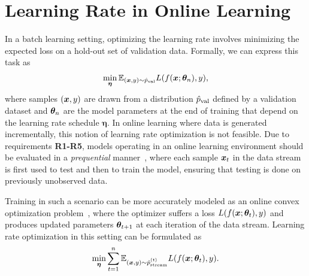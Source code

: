 \documentclass{article} %
\begin{document}
\section{Learning Rate in Online Learning}

In a batch learning setting, optimizing the learning rate involves minimizing the expected loss on a hold-out set of validation data.
Formally, we can express this task as
\begin{equation}
   \label{eq:batch_lr_optim}
   \min_{\bm{\eta}} \mathbb{E}_{({\bm{x}}, y) \sim \hat{p}_{\rm{val}}} L(f({\bm{x}}; {\bm{\theta}}_n), y),
\end{equation}
where samples $({\bm{x}}, y)$ are drawn from a distribution $\hat{p}_{\rm{val}}$ defined by a validation dataset and ${\bm{\theta}}_n$ are the model parameters at the end of training that depend on the learning rate schedule $\bm{\eta}$.
In online learning where data is generated incrementally, this notion of learning rate optimization is not feasible.
Due to requirements \textbf{R1-R5}, models operating in an online learning environment should be evaluated in a \textit{prequential} manner~\citep{bifetMOAMassiveOnline2010}, where each sample ${\bm{x}}_t$ in the data stream is first used to test and then to train the model, ensuring that testing is done on previously unobserved data.

Training in such a scenario can be more accurately modeled as an online convex optimization problem~\citep{shalev-shwartzOnlineLearningOnline2011,hazanIntroductionOnlineConvex2016}, where the optimizer suffers a loss $L(f({\bm{x}}; {\bm{\theta}}_t), y)$ and produces updated parameters ${\bm{\theta}}_{t+1}$ at each iteration of the data stream.
Learning rate optimization in this setting can be formulated as
\begin{equation}
   \label{eq:stream_lr_optim}
   \min_{\bm{\eta}} \sum_{t=1}^{n} \mathbb{E}_{({\bm{x}}, y) \sim \hat{p}_{\rm{stream}}^{(t)}} L(f({\bm{x}}; {\bm{\theta}}_t), y).
\end{equation}
\end{document}
